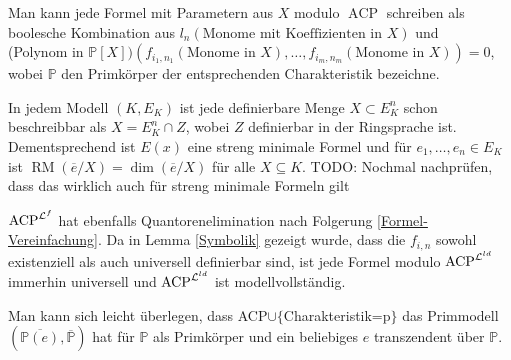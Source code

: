     \begin{corollary}\label{Formel-Vereinfachung}
    	Man kann jede Formel mit Parametern aus $X$ modulo $\operatorname{ACP}$ schreiben als boolesche Kombination aus \glqq{}$l_n(\text{Monome mit Koeffizienten in }X)$\grqq{} und\\
    	\glqq{}(Polynom in $\mathbb{P}[X])(f_{i_1,n_1}(\text{Monome in }X),\dots,f_{i_m,n_m}(\text{Monome in }X))=0$\grqq{},
        wobei $\mathbb{P}$ den Primkörper der entsprechenden Charakteristik bezeichne.
    \end{corollary}
    \begin{corollary}
    	In jedem Modell $(K,E_K)$ ist jede definierbare Menge $X\subset E_K^n$ schon beschreibbar als $X=E_K^n\cap Z$, wobei $Z$ definierbar in der Ringsprache ist. Dementsprechend ist $E(x)$ eine streng minimale Formel und für $e_1,\dots,e_n\in E_K$ ist $\operatorname{RM}(\overline{e}/X)=\dim(\overline{e}/X)$ für alle $X\subseteq K$. TODO: Nochmal nachprüfen, dass das wirklich auch für streng minimale Formeln gilt
    \end{corollary}
    \begin{corollary}
    	$\operatorname{ACP}^{\mathcal{L}^f}$ hat ebenfalls Quantorenelimination nach Folgerung \ref{Formel-Vereinfachung}. Da in Lemma \ref{Symbolik} gezeigt wurde, dass die $f_{i,n}$ sowohl existenziell als auch universell definierbar sind, ist jede Formel modulo $\operatorname{ACP}^{\mathcal{L}^{ld}}$ immerhin universell und $\operatorname{ACP}^{\mathcal{L}^{ld}}$ ist modellvollständig.
    \end{corollary}
    
    \begin{corollary}
    	Man kann sich leicht überlegen, dass ACP$\cup\{$\glqq{}Charakteristik=p\grqq{}$\}$ das Primmodell $(\overline{\mathbb{P}(e)},\overline{\mathbb{P}})$ hat für $\mathbb{P}$ als Primkörper und ein beliebiges $e$ transzendent über $\mathbb{P}$.
    \end{corollary}
    
